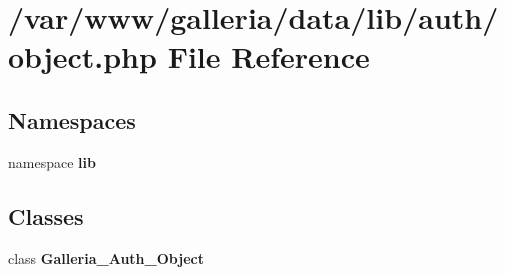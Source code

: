 \section{/var/www/galleria/data/lib/auth/object.php File Reference}
\label{auth_2object_8php}
\subsection*{Namespaces}
\begin{CompactItemize}
\item 
namespace {\bf lib}
\end{CompactItemize}
\subsection*{Classes}
\begin{CompactItemize}
\item 
class {\bf Galleria\_\-Auth\_\-Object}
\end{CompactItemize}
